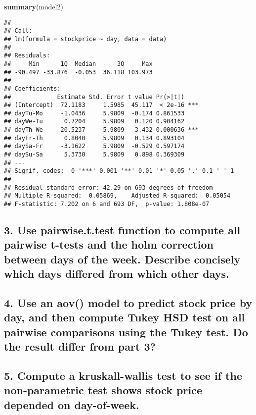 \documentclass[]{article}
\newenvironment{Shaded}{\begin{snugshade}}{\end{snugshade}}
\newcommand{\KeywordTok}[1]{\textcolor[rgb]{0.13,0.29,0.53}{\textbf{#1}}}
\newcommand{\NormalTok}[1]{#1}
\begin{document}
\begin{Shaded}
\begin{Highlighting}[]
\KeywordTok{summary}\NormalTok{(model2)}
\end{Highlighting}
\end{Shaded}

\begin{verbatim}
## 
## Call:
## lm(formula = stockprice ~ day, data = data)
## 
## Residuals:
##     Min      1Q  Median      3Q     Max 
## -90.497 -33.876  -0.053  36.118 103.973 
## 
## Coefficients:
##             Estimate Std. Error t value Pr(>|t|)    
## (Intercept)  72.1183     1.5985  45.117  < 2e-16 ***
## dayTu-Mo     -1.0436     5.9809  -0.174 0.861533    
## dayWe-Tu      0.7204     5.9809   0.120 0.904162    
## dayTh-We     20.5237     5.9809   3.432 0.000636 ***
## dayFr-Th      0.8040     5.9809   0.134 0.893104    
## daySa-Fr     -3.1622     5.9809  -0.529 0.597174    
## daySu-Sa      5.3730     5.9809   0.898 0.369309    
## ---
## Signif. codes:  0 '***' 0.001 '**' 0.01 '*' 0.05 '.' 0.1 ' ' 1
## 
## Residual standard error: 42.29 on 693 degrees of freedom
## Multiple R-squared:  0.05869,    Adjusted R-squared:  0.05054 
## F-statistic: 7.202 on 6 and 693 DF,  p-value: 1.808e-07
\end{verbatim}

\subsection{3. Use pairwise.t.test function to compute all pairwise
t-tests and the holm correction between days of the week. Describe
concisely which days differed from which other
days.}\label{use-pairwise.t.test-function-to-compute-all-pairwise-t-tests-and-the-holm-correction-between-days-of-the-week.-describe-concisely-which-days-differed-from-which-other-days.}

\subsection{4. Use an aov() model to predict stock price by day, and
then compute Tukey HSD test on all pairwise comparisons using the Tukey
test. Do the result differ from part
3?}\label{use-an-aov-model-to-predict-stock-price-by-day-and-then-compute-tukey-hsd-test-on-all-pairwise-comparisons-using-the-tukey-test.-do-the-result-differ-from-part-3}

\subsection{5. Compute a kruskall-wallis test to see if the
non-parametric test shows stock price depended on
day-of-week.}\label{compute-a-kruskall-wallis-test-to-see-if-the-non-parametric-test-shows-stock-price-depended-on-day-of-week.}
\end{document}
